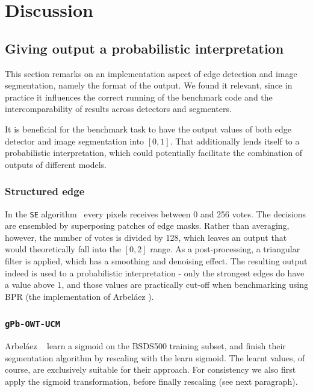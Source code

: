 \section{Discussion}
\subsection{Giving output a probabilistic interpretation}
This section remarks on an implementation aspect of edge detection and image segmentation, namely the format of the output. We found it relevant, since in practice it influences the correct running of the benchmark code and the intercomparability %
of results across detectors and segmenters.

It is beneficial %
for the benchmark task to have the output values of both edge detector and image segmentation into $[0,1]$. That additionally lends itself to a probabilistic interpretation, which could potentially facilitate the combination of outputs of different models. %

\subsubsection{Structured edge}
In the {\tt SE} algorithm~\cite{DollarICCV13edges,Dollar2015PAMI} every pixels receives between 0 and 256 votes. The decisions are ensembled by superposing patches of edge masks. Rather than averaging, however, the number of votes is divided by 128, which leaves an output that would theoretically fall into the $[0, 2]$ range. As a post-processing, a triangular filter is applied, which has a smoothing and denoising effect. The resulting output indeed is used to %
a probabilistic interpretation - only the strongest edges do have a value above 1, and those values are practically cut-off when benchmarking using BPR (the implementation of Arbel\'aez \etal).

\subsubsection{{\tt gPb-OWT-UCM}}
Arbel\'aez \etal~\cite{Arbelaez11} learn a sigmoid on the BSDS500 training subset, and finish their segmentation algorithm by rescaling with the learn sigmoid. The learnt values, of course, are exclusively suitable for their approach. For consistency we also first apply the sigmoid transformation, before finally rescaling (see next paragraph).


